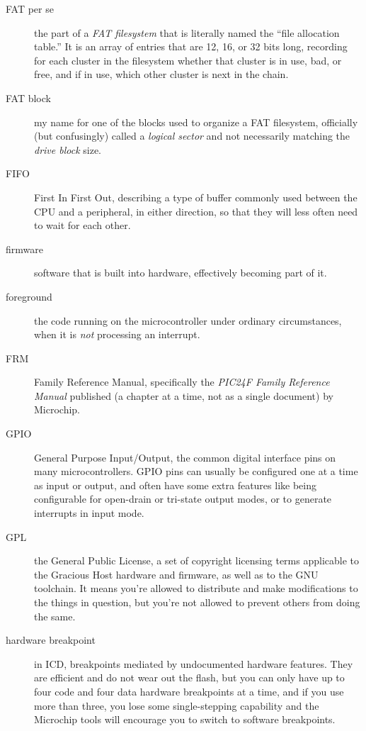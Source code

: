 \begin{description}
\item[FAT per se] the part of a \emph{FAT filesystem} that is literally
named the ``file allocation table.'' It is an array of entries that are 12,
16, or 32 bits long, recording for each cluster in the filesystem whether
that cluster is in use, bad, or free, and if in use, which other cluster is
next in the chain.

\item[FAT block] my name for one of the blocks used to organize a FAT
filesystem, officially (but confusingly) called a \emph{logical sector} and
not necessarily matching the \emph{drive block} size.

\item[FIFO] First In First Out, describing a type of buffer commonly used
between the CPU and a peripheral, in either direction, so that they will
less often need to wait for each other.

\item[firmware] software that is built into hardware, effectively becoming
part of it.

\item[foreground] the code running on the microcontroller under ordinary
circumstances, when it is \emph{not} processing an interrupt.

\item[FRM] Family Reference Manual, specifically the \emph{PIC24F Family
Reference Manual} published (a chapter at a time, not as a single document)
by Microchip.

\item[GPIO] General Purpose Input/Output, the common digital interface pins
on many microcontrollers.  GPIO pins can usually be configured one at a time
as input or output, and often have some extra features like being
configurable for open-drain or tri-state output modes, or to generate
interrupts in input mode.

\item[GPL] the General Public License, a set of copyright licensing terms
applicable to the Gracious Host hardware and firmware, as well as to the GNU
toolchain.  It means you're allowed to distribute and make modifications to
the things in question, but you're not allowed to prevent others from doing
the same.

\item[hardware breakpoint] in ICD, breakpoints mediated by undocumented
hardware features.  They are efficient and do not wear out the flash, but
you can only have up to four code and four data hardware breakpoints at a
time, and if you use more than three, you lose some single-stepping
capability and the Microchip tools will encourage you to switch to software
breakpoints.


\end{description}
